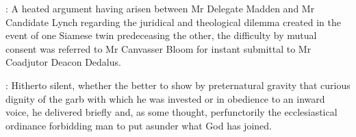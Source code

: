 \documentclass[12pt]{article}
\begin{document}

: A heated argument having arisen between Mr Delegate Madden and Mr
Candidate Lynch regarding the juridical and theological dilemma created in
the event of one Siamese twin predeceasing the other, the difficulty by
mutual consent was referred to Mr Canvasser Bloom for instant submittal to
Mr Coadjutor Deacon Dedalus.

: Hitherto silent, whether the better to show by preternatural gravity
that curious dignity of the garb with which he was invested or in
obedience to an inward voice, he delivered briefly and, as some thought,
perfunctorily the ecclesiastical ordinance forbidding man to put asunder
what God has joined.
\end{document}
